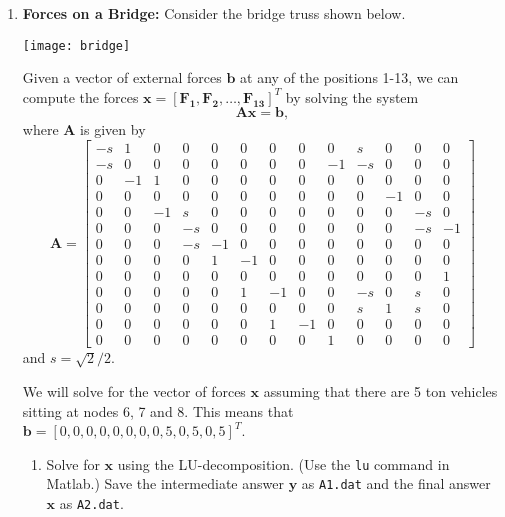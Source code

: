 \documentclass[]{article}
\newcommand{\x}{\bm{x}}					%
\newcommand{\A}{\bm{A}}					%
\begin{document}
\begin{enumerate}[resume]
	\item \textbf{Forces on a Bridge:}
	Consider the bridge truss shown below.  
	\begin{center}
	\texttt{[image: bridge]}
	\end{center}
	Given a vector of external forces $\bm{b}$ at any of the positions 1-13, we can compute the forces $\x = \left[\bm{F_1},\bm{F_2},\dotsc,\bm{F_{13}}\right]^T$ by solving the system
	\begin{equation*}
	\A\x = \bm{b}, 
	\end{equation*}
	where $\A$ is given by 
	\begin{equation*}
	\A= \left[\begin{array}{ccccccccccccc} -s & 1 & 0 & 0 & 0 & 0 & 0 & 0 & 0 & s & 0 & 0 & 0 \\ -s & 0 & 0 & 0 & 0 & 0 & 0 & 0 & -1 & -s & 0 & 0 & 0 \\ 0 & -1 & 1 & 0 & 0 & 0 & 0 & 0 & 0 & 0 & 0 & 0 & 0 \\ 0 & 0 & 0 & 0 & 0 & 0 & 0 & 0 & 0 & 0 & -1 & 0 & 0 \\ 0 & 0 & -1 & s & 0 & 0 & 0 & 0 & 0 & 0 & 0 & -s & 0 \\ 0 & 0 & 0 & -s & 0 & 0 & 0 & 0 & 0 & 0 & 0 & -s & -1 \\ 0 & 0 & 0 & -s & -1 & 0 & 0 & 0 & 0 & 0 & 0 & 0 & 0 \\ 0 & 0 & 0 & 0 & 1 & -1 & 0 & 0 & 0 & 0 & 0 & 0 & 0 \\ 0 & 0 & 0 & 0 & 0 & 0 & 0 & 0 & 0 & 0 & 0 & 0 & 1 \\ 0 & 0 & 0 & 0 & 0 & 1 & -1 & 0 & 0 & -s & 0 & s & 0 \\ 0 & 0 & 0 & 0 & 0 & 0 & 0 & 0 & 0 & s & 1 & s & 0 \\ 0 & 0 & 0 & 0 & 0 & 0 & 1 & -1 & 0 & 0 & 0 & 0 & 0 \\ 0 & 0 & 0 & 0 & 0 & 0 & 0 & 0 & 1 & 0 & 0 & 0 & 0 \end{array} \right]
	\end{equation*}
	and $s = \sqrt{2}/2$.  

	We will solve for the vector of forces $\x$ assuming that there are 5 ton vehicles sitting at nodes 6, 7 and 8.  This means that $\bm{b} = [0,0,0,0,0,0,0,0,5,0,5,0,5]^T$.  

	\begin{enumerate}
		\item Solve for $\x$ using the LU-decomposition.  (Use the \texttt{lu} command in Matlab.)  Save the intermediate answer $\bm{y}$ as \texttt{A1.dat} and the final answer $\x$ as \texttt{A2.dat}.  


\end{enumerate}
\end{enumerate}
\end{document}
